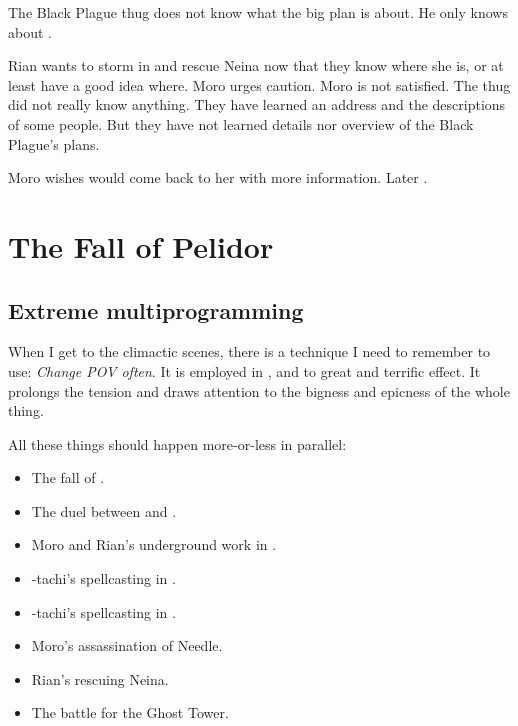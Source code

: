The Black Plague thug does not know what the big plan is about. 
He only knows about . 

Rian wants to storm in and rescue Neina now that they know where she is, or at least have a good idea where. 
Moro urges caution. 
Moro is not satisfied. 
The thug did not really know anything. 
They have learned an address and the descriptions of some people.
But they have not learned details nor overview of the Black Plague's plans. 

Moro wishes \Nasshikerr would come back to her with more information.
Later . 















\section{The Fall of Pelidor}









\subsection{Extreme multiprogramming}
When I get to the climactic scenes, there is a technique I need to remember to use: 
\emph{Change POV often}. 
It is employed in \cite{StevenEriksonIanCameronEsslemont:MalazanBookoftheFallen}, and to great and terrific effect. 
It prolongs the tension and draws attention to the bigness and epicness of the whole thing. 

All these things should happen more-or-less in parallel:
\begin{itemize}
  \item The fall of \Forclin. 
  \item The duel between \Teshrial{} and \Ishnaruchaefir. 
  \item Moro and Rian's underground work in \Malcur. 
  \item \Takestsha-tachi's spellcasting in \Forclin. 
  \item \Psyrex-tachi's spellcasting in \Malcur. 
  \item Moro's assassination of Needle. 
  \item Rian's rescuing Neina.  
  \item The battle for the Ghost Tower. 
\end{itemize}

